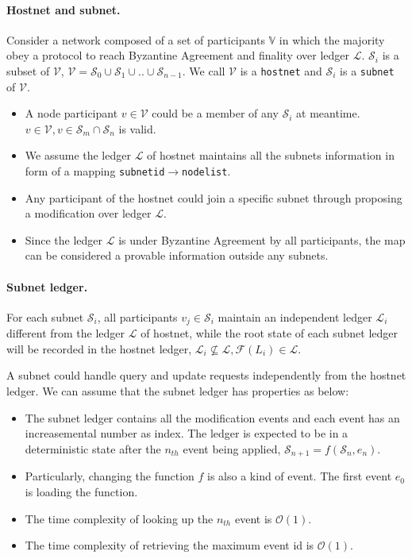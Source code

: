 \documentclass[11pt]{article}
\begin{document}
\paragraph{Hostnet and subnet.}
Consider a network composed of a set of participants $\mathbb{V}$ in which the majority obey a protocol to reach Byzantine Agreement and finality\cite{grandpa} over ledger $\mathcal{L}$.
$\mathcal{S}_{i}$ is a subset of $\mathcal{V}$, \( \mathcal{V} = \mathcal{S}_{0} \cup \mathcal{S}_{1} \cup .. \cup \mathcal{S}_{n-1}  \).
We call $\mathcal{V}$ is a \texttt{hostnet} and $\mathcal{S}_{i}$ is a \texttt{subnet} of $\mathcal{V}$.
\begin{itemize}
\item A node participant \( v \in \mathcal{V} \) could be a member of any $\mathcal{S}_{i}$ at meantime.\( v \in \mathcal{V}, v \in \mathcal{S}_{m} \cap \mathcal{S}_{n} \) is valid.
\item We assume the ledger $\mathcal{L}$ of hostnet maintains all the subnets information in form of a mapping \texttt{subnetid}\( \rightarrow \)\texttt{nodelist}.
\item Any participant of the hostnet could join a specific subnet through proposing a modification over ledger $\mathcal{L}$.
\item Since the ledger $\mathcal{L}$ is under Byzantine Agreement by all participants, the map can be considered a provable information outside any subnets.
\end{itemize}

\paragraph{Subnet ledger.}
For each subnet $\mathcal{S}_{i}$, all participants \(v_{j} \in \mathcal{S}_{i}\) maintain an independent ledger $\mathcal{L}_{i}$ different from the ledger $\mathcal{L}$ of hostnet, while the root state of each subnet ledger will be recorded in the hostnet ledger, \( \mathcal{L}_{i} \nsubseteq \mathcal{L}, \mathcal{F}(L_{i}) \in \mathcal{L} \).

A subnet could handle query and update requests independently from the hostnet ledger.
We can assume that the subnet ledger has properties as below:

\begin{itemize}
\item The subnet ledger contains all the modification events and each event has an increasemental number as index.
The ledger is expected to be in a deterministic state after the $n_{th}$ event being applied, \(\mathcal{S}_{n+1} = f(\mathcal{S}_{n}, e_{n})\).
\item Particularly, changing the function $f$ is also a kind of event. The first event $e_{0}$ is loading the function.
\item The time complexity of looking up the $n_{th}$ event is $\mathcal{O}(1)$.
\item The time complexity of retrieving the maximum event id is $\mathcal{O}(1)$.
\end{itemize}
\end{document}
